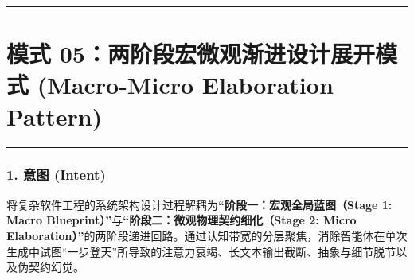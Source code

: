 \begin{Shaded}
\begin{Highlighting}[]
    \OperatorTok{=}\KeywordTok{=\textgreater{}}
\KeywordTok{=\textgreater{}}\NormalTok{))}
\NormalTok{    )}\OperatorTok{;}

    \NormalTok{ \{}
\OperatorTok{:}\OperatorTok{,}
\OperatorTok{:}\OperatorTok{,}
\OperatorTok{:}\OperatorTok{,}
\OperatorTok{:}\OperatorTok{,}
\OperatorTok{:}\OperatorTok{,}
\OperatorTok{:} \OperatorTok{,}
\NormalTok{    \}}\OperatorTok{;}
\NormalTok{  \}}
\NormalTok{\}}
\end{Highlighting}
\end{Shaded}

\begin{center}\rule{0.5\linewidth}{0.5pt}\end{center}

\section{模式 05：两阶段宏微观渐进设计展开模式 (Macro-Micro Elaboration
Pattern)}\label{ux6a21ux5f0f-05ux4e24ux9636ux6bb5ux5b8fux5faeux89c2ux6e10ux8fdbux8bbeux8ba1ux5c55ux5f00ux6a21ux5f0f-macro-micro-elaboration-pattern}

\begin{center}\rule{0.5\linewidth}{0.5pt}\end{center}

\subsubsection{1. 意图 (Intent)}\label{ux610fux56fe-intent-4}

将复杂软件工程的系统架构设计过程解耦为\textbf{``阶段一：宏观全局蓝图（Stage
1: Macro Blueprint）''}与\textbf{``阶段二：微观物理契约细化（Stage 2:
Micro
Elaboration）''}的两阶段递进回路。通过认知带宽的分层聚焦，消除智能体在单次生成中试图``一步登天''所导致的注意力衰竭、长文本输出截断、抽象与细节脱节以及伪契约幻觉。

